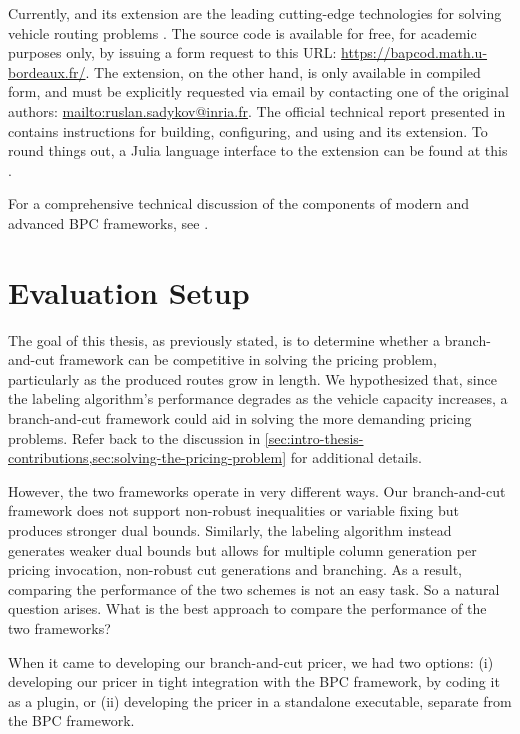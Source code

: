 \medskip

Currently, \bapcod{} and its \vrpsolver{} extension are the leading cutting-edge technologies
for solving vehicle routing problems \parencite{pessoa2020generic}.
The \bapcod{} source code is available for free, for academic purposes only,
by issuing a form request to this URL: \url{https://bapcod.math.u-bordeaux.fr/}.
The \vrpsolver{} extension, on the other hand, is only available in compiled form,
and must be explicitly requested via email by contacting one of the
original authors: \url{mailto:ruslan.sadykov@inria.fr}.
The official technical report presented in \textcite{sadykov2021} contains instructions
for building, configuring, and using \bapcod{} and its \vrpsolver{} extension.
To round things out, a Julia language interface to the \vrpsolver{} extension
can be found at this .

For a comprehensive technical discussion of the components of
modern and advanced BPC frameworks, see \textcite{sadykov2019modern}.

\section{Evaluation Setup}
\label{sec:results-evaluation-setup}

The goal of this thesis, as previously stated,
is to determine whether a branch-and-cut framework can be competitive in solving the pricing problem,
particularly as the produced routes grow in length.
We hypothesized that, since the labeling algorithm's performance degrades
as the vehicle capacity increases,
a branch-and-cut framework could aid in solving the more demanding pricing problems.
Refer back to the discussion in \cref{sec:intro-thesis-contributions,sec:solving-the-pricing-problem}
for additional details.

However, the two frameworks operate in very different ways.
Our branch-and-cut framework does not support non-robust inequalities or variable fixing
but produces stronger dual bounds.
Similarly, the labeling algorithm instead generates weaker dual bounds
but allows for multiple column generation per pricing invocation,
non-robust cut generations and branching.
As a result, comparing the performance of the two schemes is not an easy task.
So a natural question arises.
What is the best approach to compare the performance of the two frameworks?

\medskip

When it came to developing our branch-and-cut pricer, we had two options:
(i) developing our pricer in tight integration with the BPC framework, by coding it as a \bapcod{} plugin,
or (ii) developing the pricer in a standalone executable, separate from the BPC framework.

